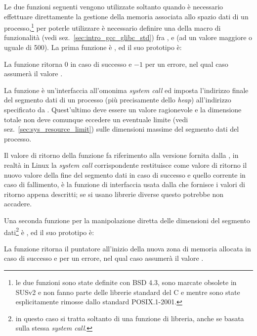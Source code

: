 
Le due funzioni seguenti vengono utilizzate soltanto quando è necessario
effettuare direttamente la gestione della memoria associata allo spazio dati
di un processo,\footnote{le due funzioni sono state definite con BSD 4.3, sono
  marcate obsolete in SUSv2 e non fanno parte delle librerie standard del C e
  mentre sono state esplicitamente rimosse dallo standard POSIX.1-2001.} per
poterle utilizzare è necessario definire una della macro di funzionalità (vedi
sez.~\ref{sec:intro_gcc_glibc_std}) fra ,
 e  (ad un valore maggiore o
uguale di 500). La prima funzione è , ed il suo prototipo è:

\begin{funcproto}{ 
}
{La funzione ritorna $0$ in caso di successo e $-1$ per un errore,
  nel qual caso  assumerà il valore .}
\end{funcproto}

La funzione è un'interfaccia all'omonima \textit{system call} ed imposta
l'indirizzo finale del segmento dati di un processo (più precisamente dello
\textit{heap}) all'indirizzo specificato da . Quest'ultimo deve
essere un valore ragionevole e la dimensione totale non deve comunque eccedere
un eventuale limite (vedi sez.~\ref{sec:sys_resource_limit}) sulle dimensioni
massime del segmento dati del processo.

Il valore di ritorno della funzione fa riferimento alla versione fornita dalla
, in realtà in Linux la \textit{system call} corrispondente
restituisce come valore di ritorno il nuovo valore della fine del segmento
dati in caso di successo e quello corrente in caso di fallimento, è la
funzione di interfaccia usata dalla  che fornisce i valori di
ritorno appena descritti; se si usano librerie diverse questo potrebbe non
accadere.

Una seconda funzione per la manipolazione diretta delle dimensioni del
segmento dati\footnote{in questo caso si tratta soltanto di una funzione di
  libreria, anche se basata sulla stessa \textit{system call}.} è
, ed il suo prototipo è:

\begin{funcproto}{ 
}
{La funzione ritorna il puntatore all'inizio della nuova zona di memoria
  allocata in caso di successo e  per un errore, nel qual
  caso  assumerà il valore .}
\end{funcproto}

